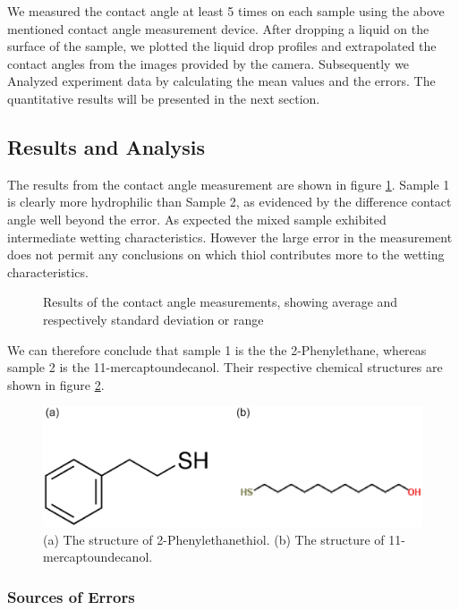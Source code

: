 We measured the contact angle at least 5 times on each sample using the above mentioned contact angle measurement device. After dropping a liquid on the surface of the sample, we plotted the liquid drop profiles and extrapolated the contact angles from the images provided by the camera. Subsequently we Analyzed experiment data by calculating the mean values and the errors. The quantitative results will be presented in the next section.

\subsection{Results and Analysis}

The results from the contact angle measurement are shown in figure \ref{fig:results}. Sample 1 is clearly more hydrophilic than Sample 2, as evidenced by the difference contact angle well beyond the error. As expected the mixed sample exhibited intermediate wetting characteristics. However the large error in the measurement does not permit any conclusions on which thiol contributes more to the wetting characteristics.

\begin{figure}
\centering

\caption{Results of the contact angle measurements, showing average and  respectively standard deviation or range}
\label{fig:results}
\end{figure}

We can therefore conclude that sample 1 is the the 2-Phenylethane, whereas sample 2 is the 11-mercaptoundecanol. Their respective chemical structures are shown in figure \ref{11mer}.


\begin{figure}[h]
\centering
\includegraphics[width=0.9\columnwidth]{11mer.eps}
\caption{(a) The structure of 2-Phenylethanethiol. (b) The structure of 11-mercaptoundecanol. }
\label{11mer}
\end{figure}

\subsubsection{Sources of Errors}

